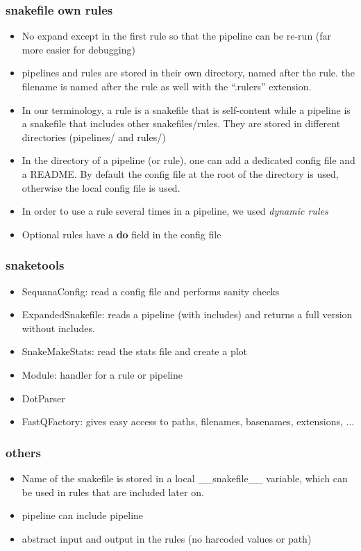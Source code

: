 \documentclass{beamer}
\begin{document}
\begin{frame}
 \frametitle{snakefile own rules}
 \tiny
 \begin{block}{}
  \begin{itemize}
   \item No expand except in the first rule so that the pipeline can be 
     re-run (far more easier for debugging)
   \item pipelines and rules are stored in their own directory, named after the rule. 
   the filename is named after the rule as well with the ``.rulers'' extension.
   \item In our terminology, a rule is a snakefile that is self-content while
   a pipeline is a snakefile that includes other snakefiles/rules. They are stored
   in different directories (pipelines/ and rules/)
   \item In the directory of a pipeline (or rule), one can add a dedicated config 
   file and a README. By default the config file at the root of the directory is 
   used, otherwise the local config file is used.
   \item In order to use a rule several times in a pipeline, we used \textit{dynamic rules}
   \item Optional rules have a \textbf{do} field in the config file
   \end{itemize}
 \end{block} 
\end{frame}



\begin{frame}
\frametitle{snaketools}
 \begin{block}{}
 \begin{itemize}
  \item SequanaConfig: read a config file and performs sanity checks
  \item ExpandedSnakefile: reads a pipeline (with includes) and returns a full version
  without includes.
  \item SnakeMakeStats: read the stats file and create a plot
  \item Module: handler for a rule or pipeline
  \item DotParser
  \item FastQFactory: gives easy access to paths, filenames, basenames, extensions, ...
  \end{itemize}
 \end{block} 
\end{frame}


\begin{frame}
 \frametitle{others}
 \begin{block}{}
 \begin{itemize}
  \item Name of the snakefile is stored in a local \_\_snakefile\_\_ variable, which can be
 used in rules that are included later on.
 \item pipeline can include pipeline
 \item abstract input and output in the rules (no harcoded values or path)
 \end{itemize}
 \end{block}
\end{frame}
\end{document}
